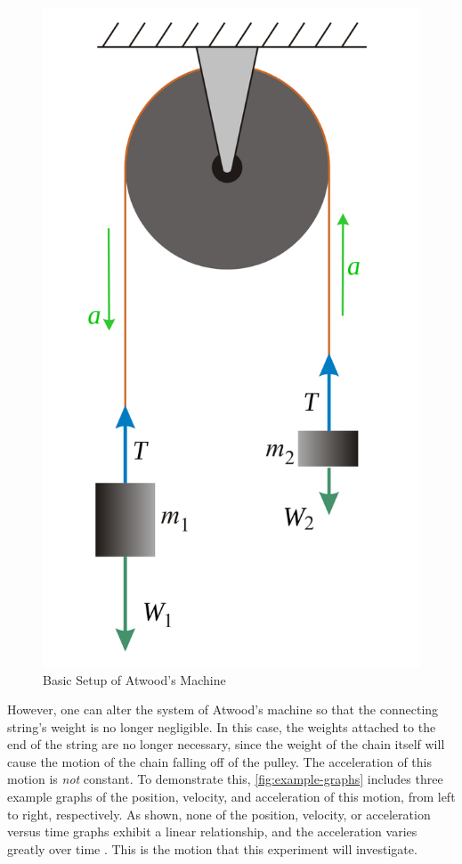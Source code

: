 \documentclass[stu,biblatex,floatsintext]{apa7}
\begin{document}
\begin{figure}[H]
	\centering
	\caption{Basic Setup of Atwood's Machine}
	\label{fig:atwoods-machine}
	\includegraphics[height=0.25\paperheight]{atwoods-machine-fbd}
\end{figure}

However, one can alter the system of Atwood's machine so that the connecting string's weight is no longer negligible. In this case, the weights attached to the end of the string are no longer necessary, since the weight of the chain itself will cause the motion of the chain falling off of the pulley. The acceleration of this motion is \emph{not} constant. To demonstrate this, \autoref{fig:example-graphs} includes three example graphs of the position, velocity, and acceleration of this motion, from left to right, respectively. As shown, none of the position, velocity, or acceleration versus time graphs exhibit a linear relationship, and the acceleration varies greatly over time \parencite{Hilsdorf2023AtwoodsHeavyChainHandout}. This is the motion that this experiment will investigate.
\end{document}
